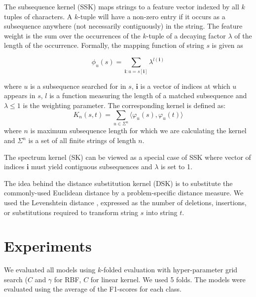 \documentclass[final]{ieee}
\begin{document}
The subsequence kernel (SSK) maps strings to a feature vector indexed by all $k$ tuples of characters. A $k$-tuple will have a non-zero entry if it occurs as a subsequence anywhere (not necessarily contiguously) in the string. The feature weight is the sum over the occurrences of the $k$-tuple of a decaying factor $\lambda$ of the length of the occurrence. Formally, the mapping function of string $s$ is given as

\[ \phi_u(s) = \sum_{\mathbf{i}:u=s[\mathbf{i}]} \lambda^{l(\mathbf{i})} \]

where $u$ is a subsequence searched for in $s$, $\mathbf{i}$ is a vector of indices at which $u$ appears in $s$, $l$ is a function measuring the length of a matched subsequence and $\lambda \leq 1$ is the weighting parameter. The corresponding kernel is defined as:
%
\begin{equation*}
	K_n(s, t) = \sum_{u \in \Sigma^n} \langle \varphi_u(s), \varphi_u(t) \rangle
\end{equation*}
%
where $n$ is maximum subsequence length for which we are calculating the kernel and $\Sigma^n$ is a set of all finite strings of length $n$.

The spectrum kernel (SK) can be viewed as a special case of SSK where vector of indices $\mathbf{i}$ must yield contiguous subsequences and $\lambda$ is set to 1.

The idea behind the distance substitution kernel (DSK) is to substitute the commonly-used Euclidean distance by a problem-specific distance measure. We used the Levenshtein distance \citep{navarro2001guided}, expressed as the number of deletions, insertions, or substitutions required to transform string $s$ into string $t$.

\section{Experiments}
We evaluated all models using $k$-folded evaluation with hyper-parameter grid search ($C$ and $\gamma$ for RBF, $C$ for linear kernel. We used 5 folds. The models were evaluated using the average of the F1-scores for each class.
\end{document}
